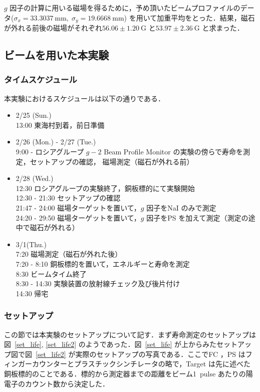 $g$ 因子の計算に用いる磁場を得るために，予め頂いたビームプロファイルのデータ($\sigma_x = 33.3037~\mathrm{mm}, \; \sigma_y = 19.6668~\mathrm{mm}$) を用いて加重平均をとった．結果，磁石が外れる前後の磁場がそれぞれ$56.06 \pm 1.20~\mathrm{G}$ と$53.97\pm 2.36~\mathrm{G}$ と求まった．

\newpage

\subsection{ビームを用いた本実験}

\subsubsection{タイムスケジュール}
本実験におけるスケジュールは以下の通りである．
\begin{itemize}
\item 2/25 (Sun.)\\
13:00   東海村到着，前日準備
\item 2/26 (Mon.) - 2/27 (Tue.)\\
9:00 - ロシアグループ $g - 2$ Beam Profile Monitor の実験の傍らで寿命を測定，セットアップの確認， 磁場測定（磁石が外れる前）
\item 2/28 (Wed.)\\
12:30  \phantom{-} ロシアグループの実験終了，銅板標的にて実験開始\\ 
12:30 - 21:30 セットアップの確認\\
21:47 - 24:00 磁場ターゲットを置いて，$g$ 因子をNaI のみで測定\\
24:20 - 29:50 磁場ターゲットを置いて，$g$ 因子をPS を加えて測定（測定の途中で磁石が外れる）
\item 3/1(Thu.)\\
7:20 \phantom{-} 磁場測定（磁石が外れた後）\\
7:20 - 8:10 銅板標的を置いて，エネルギーと寿命を測定\\
8:30 \phantom{-} ビームタイム終了\\
8:30 - 14:30 実験装置の放射線チェック及び後片付け \\
14:30 帰宅
\end{itemize}

\subsubsection{セットアップ}
この節では本実験のセットアップについて記す．まず寿命測定のセットアップは図~\ref{set_life}, \ref{set_life2} のようであった．図~\ref{set_life} が上からみたセットアップ図で図~\ref{set_life2} が実際のセットアップの写真である．ここでFC ，PS はフィンガーカウンターとプラスチックシンチレータの略で，Target は先に述べた銅板標的のことである．標的から測定器までの距離をビーム1~pulse あたりの陽電子のカウント数から決定した．

